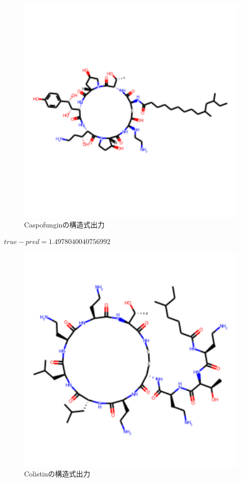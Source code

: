 \documentclass[a4j,11pt]{jarticle}
\begin{document}
\begin{figure}[H]
\centering
\includegraphics[scale=0.5]{./images/Caspofungin.pdf}
\caption{Caspofunginの構造式出力}
\label{fig:ex1_I}
\end{figure}
$true - pred = 1.4978040040756992$
\begin{figure}[H]
\centering
\includegraphics[scale=0.5]{./images/Colistin.pdf}
\caption{Colistinの構造式出力}
\label{fig:ex1_I_2}
\end{figure}
\end{document}
